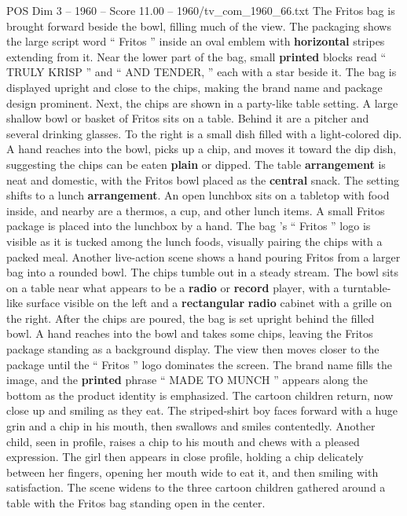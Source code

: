 \begin{textsample}{POS Dim 3 – 1960 – Score 11.00 – 1960/tv\_com\_1960\_66.txt}
The Fritos bag is brought forward beside the bowl, filling much of the view.
The packaging shows the large script word “ Fritos ” inside an oval emblem with \textbf{horizontal} stripes extending from it.
Near the lower part of the bag, small \textbf{printed} blocks read “ TRULY KRISP ” and “ AND TENDER, ” each with a star beside it.
The bag is displayed upright and close to the chips, making the brand name and package design prominent.
Next, the chips are shown in a party-like table setting.
A large shallow bowl or basket of Fritos sits on a table.
Behind it are a pitcher and several drinking glasses.
To the right is a small dish filled with a light-colored dip.
A hand reaches into the bowl, picks up a chip, and moves it toward the dip dish, suggesting the chips can be eaten \textbf{plain} or dipped.
The table \textbf{arrangement} is neat and domestic, with the Fritos bowl placed as the \textbf{central} snack.
The setting shifts to a lunch \textbf{arrangement}.
An open lunchbox sits on a tabletop with food inside, and nearby are a thermos, a cup, and other lunch items.
A small Fritos package is placed into the lunchbox by a hand.
The bag ’s “ Fritos ” logo is visible as it is tucked among the lunch foods, visually pairing the chips with a packed meal.
Another live-action scene shows a hand pouring Fritos from a larger bag into a rounded bowl.
The chips tumble out in a steady stream.
The bowl sits on a table near what appears to be a \textbf{radio} or \textbf{record} player, with a turntable-like surface visible on the left and a \textbf{rectangular} \textbf{radio} cabinet with a grille on the right.
After the chips are poured, the bag is set upright behind the filled bowl.
A hand reaches into the bowl and takes some chips, leaving the Fritos package standing as a background display.
The view then moves closer to the package until the “ Fritos ” logo dominates the screen.
The brand name fills the image, and the \textbf{printed} phrase “ MADE TO MUNCH ” appears along the bottom as the product identity is emphasized.
The cartoon children return, now close up and smiling as they eat.
The striped-shirt boy faces forward with a huge grin and a chip in his mouth, then swallows and smiles contentedly.
Another child, seen in profile, raises a chip to his mouth and chews with a pleased expression.
The girl then appears in close profile, holding a chip delicately between her fingers, opening her mouth wide to eat it, and then smiling with satisfaction.
The scene widens to the three cartoon children gathered around a table with the Fritos bag standing open in the center.

\end{textsample}

